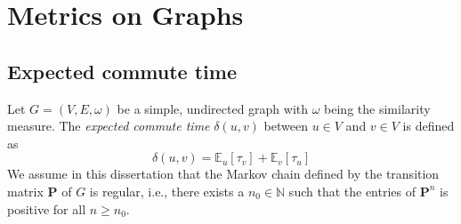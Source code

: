 \section{Metrics on Graphs}
\subsection{Expected commute time}
\label{sec:resistance-distances}
Let $G = (V,E,\omega)$ be a simple, undirected graph with $\omega$
being the similarity measure. The {\em expected commute time}
$\delta(u,v)$ between $u \in V$ and $v \in V$ is defined as
\begin{equation}
  \label{eq:25}
  \delta(u,v) = \mathbb{E}_{u}[\tau_v] + \mathbb{E}_{v}[\tau_u]
\end{equation}
We assume in this dissertation that the Markov chain defined by the
transition matrix $\bm{P}$ of $G$ is regular, i.e., there exists a
$n_0 \in \mathbb{N}$ such that the entries of $\bm{P}^{n}$ is positive
for all $n \geq n_0$. 

